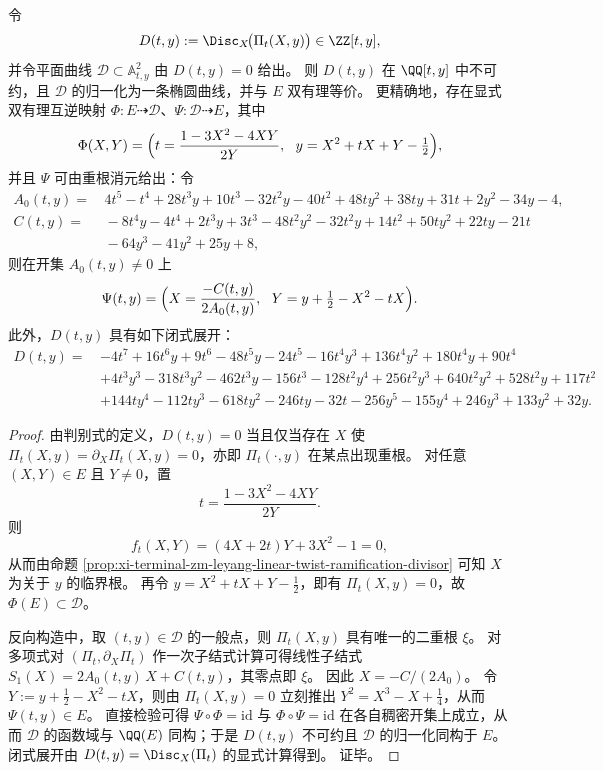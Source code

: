 \begin{theorem}[判别式曲线的椭圆化：\texorpdfstring{$\Disc_X(\Pi_t)=0$}{Disc\_X(Pi\_t)=0} 的归一化]\label{thm:xi-terminal-zm-leyang-linear-twist-discriminant-elliptification}
令
\[
D(t,y):=\Disc_{X}\!\bigl(\Pi_t(X,y)\bigr)\in \ZZ[t,y],
\]
并令平面曲线 \(\mathcal D\subset\mathbb A^2_{t,y}\) 由 \(D(t,y)=0\) 给出。
则 \(D(t,y)\) 在 \(\QQ[t,y]\) 中不可约，且 \(\mathcal D\) 的归一化为一条椭圆曲线，并与 \(E\) 双有理等价。
更精确地，存在显式双有理互逆映射 \(\Phi:E\dashrightarrow\mathcal D\)、\(\Psi:\mathcal D\dashrightarrow E\)，其中
\[
\Phi(X,Y)=\Bigl(t=\frac{1-3X^2-4XY}{2Y},\ \ y=X^2+tX+Y-\tfrac12\Bigr),
\]
并且 \(\Psi\) 可由重根消元给出：令
\begin{align*}
A_0(t,y)=&\,4t^5-t^4+28t^3y+10t^3-32t^2y-40t^2+48ty^2+38ty+31t+2y^2-34y-4,\\
C(t,y)=&\,-8t^4y-4t^4+2t^3y+3t^3-48t^2y^2-32t^2y+14t^2+50ty^2+22ty-21t\\
&\,-64y^3-41y^2+25y+8,
\end{align*}
则在开集 \(A_0(t,y)\neq 0\) 上
\[
\Psi(t,y)=\Bigl(X=\frac{-C(t,y)}{2A_0(t,y)},\ \ Y=y+\tfrac12-X^2-tX\Bigr).
\]
此外，\(D(t,y)\) 具有如下闭式展开：
\begin{align*}
D(t,y)=\,&-4 t^7 +16 t^6 y +9 t^6 -48 t^5 y -24 t^5 -16 t^4 y^3 +136 t^4 y^2 +180 t^4 y +90 t^4\\
&+4 t^3 y^3 -318 t^3 y^2 -462 t^3 y -156 t^3 -128 t^2 y^4 +256 t^2 y^3 +640 t^2 y^2 +528 t^2 y +117 t^2\\
&+144 t y^4 -112 t y^3 -618 t y^2 -246 t y -32 t -256 y^5 -155 y^4 +246 y^3 +133 y^2 +32 y .
\end{align*}
\end{theorem}
\begin{proof}
由判别式的定义，\(D(t,y)=0\) 当且仅当存在 \(X\) 使 \(\Pi_t(X,y)=\partial_X\Pi_t(X,y)=0\)，亦即 \(\Pi_t(\cdot,y)\) 在某点出现重根。
对任意 \((X,Y)\in E\) 且 \(Y\neq 0\)，置
\[
t=\frac{1-3X^2-4XY}{2Y}.
\]
则
\[
f_t(X,Y)=(4X+2t)Y+3X^2-1=0,
\]
从而由命题 \ref{prop:xi-terminal-zm-leyang-linear-twist-ramification-divisor} 可知 \(X\) 为关于 \(y\) 的临界根。
再令 \(y=X^2+tX+Y-\tfrac12\)，即有 \(\Pi_t(X,y)=0\)，故 \(\Phi(E)\subset \mathcal D\)。
\par
反向构造中，取 \((t,y)\in\mathcal D\) 的一般点，则 \(\Pi_t(X,y)\) 具有唯一的二重根 \(\xi\)。
对多项式对 \((\Pi_t,\partial_X\Pi_t)\) 作一次子结式计算可得线性子结式
\(
S_1(X)=2A_0(t,y)\,X+C(t,y)
\)，其零点即 \(\xi\)。
因此 \(X=-C/(2A_0)\)。
令 \(Y:=y+\tfrac12-X^2-tX\)，则由 \(\Pi_t(X,y)=0\) 立刻推出 \(Y^2=X^3-X+\tfrac14\)，从而 \(\Psi(t,y)\in E\)。
直接检验可得 \(\Psi\circ\Phi=\mathrm{id}\) 与 \(\Phi\circ\Psi=\mathrm{id}\) 在各自稠密开集上成立，从而 \(\mathcal D\) 的函数域与 \(\QQ(E)\) 同构；于是 \(D(t,y)\) 不可约且 \(\mathcal D\) 的归一化同构于 \(E\)。
闭式展开由 \(D(t,y)=\Disc_X(\Pi_t)\) 的显式计算得到。
证毕。
\end{proof}

